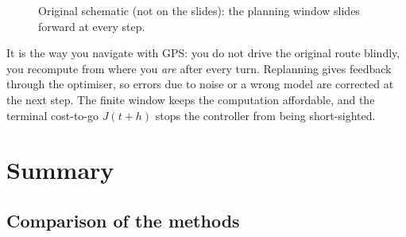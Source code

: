 \documentclass[11pt,a4paper]{article}
\theoremstyle{plain}
\theoremstyle{definition}
\theoremstyle{remark}
\begin{document}
\begin{figure}[H]
\centering
{}
\caption{Original schematic (not on the slides): the planning window slides forward at every step.}
\end{figure}

\begin{intuition}
It is the way you navigate with GPS: you do not drive the original route blindly, you recompute from where you \emph{are} after every turn. Replanning gives feedback through the optimiser, so errors due to noise or a wrong model are corrected at the next step. The finite window keeps the computation affordable, and the terminal cost-to-go $J(t+h)$ stops the controller from being short-sighted.
\end{intuition}

\section{Summary}

\subsection{Comparison of the methods}
\end{document}
